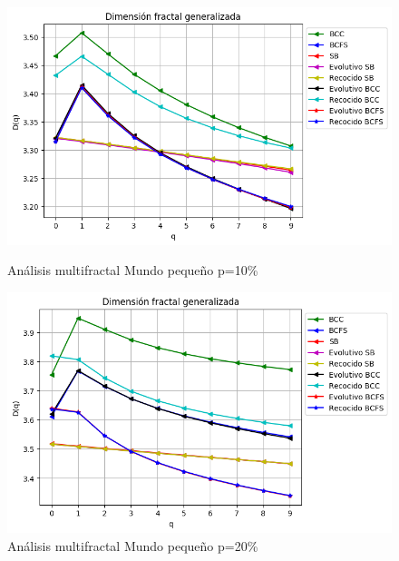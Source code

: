 \begin{figure}[!htb]
    \begin{minipage}{0.48\textwidth}
        \centering
        \includegraphics[scale=0.5]{CapituloAAnexos/imagenesAnexoC/Fractalidad/grafica_Dq20180506_141058SmallWorld5000NodesRewire01.png}
        \caption{Análisis multifractal Mundo pequeño p=10\%}
    \end{minipage}\hfill
   \begin{minipage}{0.48\textwidth}
         \centering
        \includegraphics[scale=0.5]{CapituloAAnexos/imagenesAnexoC/Fractalidad/grafica_Dq20180505_223804SmallWorld5000NodesRewire02.png}
    \caption{Análisis multifractal Mundo pequeño p=20\%}
    \end{minipage}
\end{figure}


